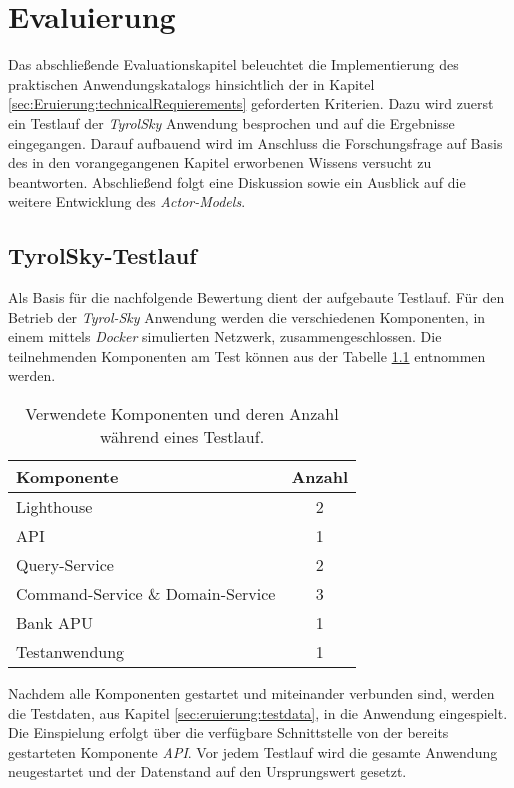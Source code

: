 \chapter{Evaluierung} \label{cha:evaluation}
Das abschließende Evaluationskapitel beleuchtet die Implementierung des praktischen Anwendungskatalogs hinsichtlich der in Kapitel \ref{sec:Eruierung:technicalRequierements} geforderten Kriterien. Dazu wird zuerst ein Testlauf der \textit{TyrolSky} Anwendung besprochen und auf die Ergebnisse eingegangen. Darauf aufbauend wird im Anschluss die Forschungsfrage auf Basis des in den vorangegangenen Kapitel erworbenen Wissens versucht zu beantworten. Abschließend folgt eine Diskussion sowie ein Ausblick auf die weitere Entwicklung des \textit{Actor-Models}. 

\section{TyrolSky-Testlauf}
Als Basis für die nachfolgende Bewertung dient der aufgebaute Testlauf. Für den Betrieb der \textit{Tyrol-Sky} Anwendung werden die verschiedenen Komponenten, in einem mittels \textit{Docker} simulierten Netzwerk, zusammengeschlossen. Die teilnehmenden Komponenten am Test können aus der Tabelle \ref{tab:evaluation:testStage} entnommen werden. \\
\begin{table}
    \centering
    \begin{tabular}{lc}
        Komponente       &   Anzahl  \\ \hline
        Lighthouse       &   2       \\
        API              &   1       \\
        Query-Service    &   2       \\
        Command-Service \& Domain-Service  &   3       \\
        Bank APU         &   1       \\
        Testanwendung    &   1
    \end{tabular}
    \caption{Verwendete Komponenten und deren Anzahl während eines Testlauf.}
    \label{tab:evaluation:testStage}
\end{table}
Nachdem alle Komponenten gestartet und miteinander verbunden sind, werden die Testdaten, aus Kapitel \ref{sec:eruierung:testdata}, in die Anwendung eingespielt. Die Einspielung erfolgt über die verfügbare Schnittstelle von der bereits gestarteten Komponente \textit{API}. Vor jedem Testlauf wird die gesamte Anwendung neugestartet und der Datenstand auf den Ursprungswert gesetzt. \\

